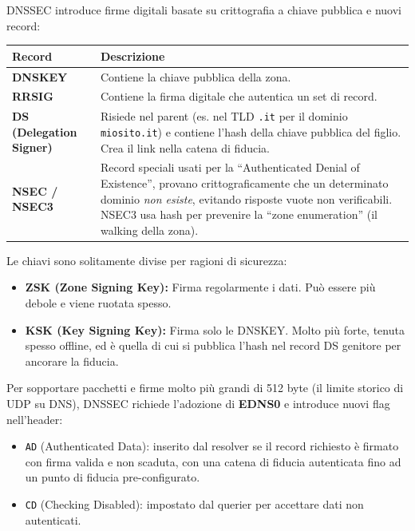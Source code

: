 \documentclass{article}
\begin{document}
DNSSEC introduce firme digitali basate su crittografia a chiave pubblica e nuovi record:

\begin{table}[h!]
\centering
\begin{tabular}{ll}
\toprule
\textbf{Record} & \textbf{Descrizione} \\
\midrule
\textbf{DNSKEY} & Contiene la chiave pubblica della zona. \\
\textbf{RRSIG} & Contiene la firma digitale che autentica un set di record. \\
\textbf{DS (Delegation Signer)} & Risiede nel parent (es. nel TLD \texttt{.it} per il dominio \texttt{miosito.it}) e contiene l'hash della chiave pubblica del figlio. Crea il link nella catena di fiducia. \\
\textbf{NSEC / NSEC3} & Record speciali usati per la ``Authenticated Denial of Existence'', provano crittograficamente che un determinato dominio \emph{non esiste}, evitando risposte vuote non verificabili. NSEC3 usa hash per prevenire la ``zone enumeration'' (il walking della zona). \\
\bottomrule
\end{tabular}
\end{table}

Le chiavi sono solitamente divise per ragioni di sicurezza:
\begin{itemize}
    \item \textbf{ZSK (Zone Signing Key):} Firma regolarmente i dati. Può essere più debole e viene ruotata spesso.
    \item \textbf{KSK (Key Signing Key):} Firma solo le DNSKEY. Molto più forte, tenuta spesso offline, ed è quella di cui si pubblica l'hash nel record DS genitore per ancorare la fiducia.
\end{itemize}

Per sopportare pacchetti e firme molto più grandi di 512 byte (il limite storico di UDP su DNS), DNSSEC richiede l'adozione di \textbf{EDNS0} e introduce nuovi flag nell'header:
\begin{itemize}
    \item \texttt{AD} (Authenticated Data): inserito dal resolver se il record richiesto è firmato con firma valida e non scaduta, con una catena di fiducia autenticata fino ad un punto di fiducia pre-configurato.
    \item \texttt{CD} (Checking Disabled): impostato dal querier per accettare dati non autenticati.
\end{itemize}
\end{document}
